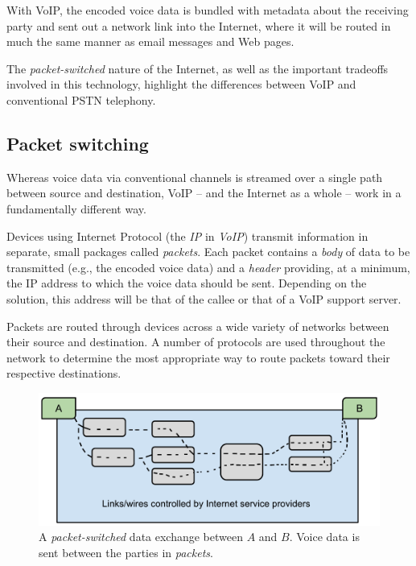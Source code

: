 \documentclass[11pt]{article}
\newcommand{\term}[1]{\textit{#1}}
\begin{document}
With VoIP, the encoded voice data is bundled with metadata about the receiving
party and sent out a network link into the Internet, where it will be routed in
much the same manner as email messages and Web pages.

The \term{packet-switched} nature of the Internet, as well as the important
tradeoffs involved in this technology, highlight the differences between VoIP
and conventional PSTN telephony.

\subsection{Packet switching}

Whereas voice data via conventional channels is streamed over a single path
between source and destination, VoIP -- and the Internet as a whole -- work in a
fundamentally different way.

Devices using Internet Protocol (the \term{IP} in \term{VoIP}) transmit
information in separate, small packages called \term{packets}. Each packet
contains a \term{body} of data to be transmitted (e.g., the encoded voice data)
and a \term{header} providing, at a minimum, the IP address to which the voice
data should be sent. Depending on the solution, this address will be that of the
callee or that of a VoIP support server.

Packets are routed through devices across a wide variety of networks between
their source and destination. A number of protocols are used throughout the
network to determine the most appropriate way to route packets toward their
respective destinations.

\begin{figure}
	\centering
	\includegraphics[width=\textwidth]{packet_switched}
	\caption{
		A \term{packet-switched} data exchange between $A$ and $B$. Voice data is
		sent between the parties in \term{packets}.
	}
	\label{fig:packet_switched}
\end{figure}
\end{document}
